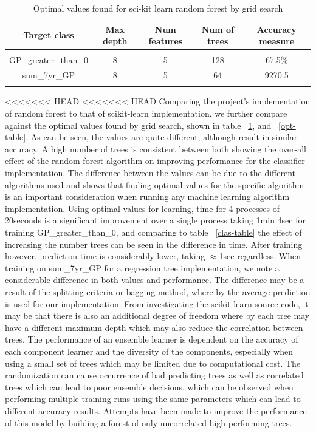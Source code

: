 \documentclass{article} %
\begin{document}
\begin{table}[h]
\caption{Optimal values found for sci-kit learn random forest by grid search}
\begin{center}
\begin{tabular}{ccccc}
{\bf Target class} &{\bf Max depth} &{\bf Num features} &{\bf Num of trees}&{\bf Accuracy measure}
\\ \hline \\
GP\_greater\_than\_0         &8	&5 &128 &67.5\%\\
sum\_7yr\_GP         &8	&5 &64 &9270.5\\
\label{scikit-table}
\end{tabular}
\end{center}
\end{table}

<<<<<<< HEAD
<<<<<<< HEAD
Comparing the project's implementation of random forest to that of scikit-learn implementation, we further compare against the optimal values found by grid search, shown in table ~\ref{scikit-table}, and ~\ref{opt-table}. As can be seen, the values are quite different, although result in similar accuracy. A high number of trees is consistent between both showing the over-all effect of the random forest algorithm on improving performance for the classifier implementation. The difference between the values can be due to the different algorithms used and shows that finding optimal values for the specific algorithm is an important consideration when running any machine learning algorithm implementation. Using optimal values for learning, time for 4 processes of 20seconds is a significant improvement over a single process taking 1min 4sec for training GP\_greater\_than\_0, and comparing to table ~\ref{clas-table} the effect of increasing the number trees can be seen in the difference in time. After training however, prediction time is considerably lower, taking $\approx$1sec regardless. When training on sum\_7yr\_GP for a regression tree implementation, we note a considerable difference in both values and performance. The difference may be a result of the splitting criteria or bagging method, where by the average prediction is used for our implementation. From investigating the scikit-learn source code, it may be that there is also an additional degree of freedom where by each tree may have a different maximum depth which may also reduce the correlation between trees. The performance of an ensemble learner is dependent on the accuracy of each component learner and the diversity of the components, especially when using a small set of trees which may be limited due to computational cost. The randomization can cause occurrence of bad predicting trees as well as correlated trees which can lead to poor ensemble decisions, which can be observed when performing multiple training runs using the same parameters which can lead to different accuracy results. Attempts have been made to improve the performance of this model by building a forest of only uncorrelated high performing trees. \cite{Bharathidason2014}
\end{document}
